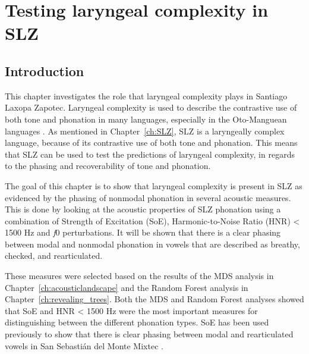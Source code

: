 \chapter{Testing laryngeal complexity in SLZ} \label{ch:testing_lc}

\section{Introduction}\label{sec:introduction_of_lc}

This chapter investigates the role that laryngeal complexity plays in Santiago Laxopa Zapotec. Laryngeal complexity is used to describe the contrastive use of both tone and phonation in many languages, especially in the Oto-Manguean languages \citep{blankenshipTimeCourseBreathiness1997,blankenshipTimingNonmodalPhonation2002,silvermanLaryngealComplexityOtomanguean1997,silvermanPhasingRecoverability1997}. As mentioned in Chapter~\ref{ch:SLZ}, SLZ is a laryngeally complex language, because of its contrastive use of both tone and phonation. This means that SLZ can be used to test the predictions of laryngeal complexity, in regards to the phasing and recoverability of tone and phonation.

The goal of this chapter is to show that laryngeal complexity is present in SLZ as evidenced by the phasing of nonmodal phonation in several acoustic measures. This is done by looking at the acoustic properties of SLZ phonation using a combination of Strength of Excitation (SoE), Harmonic-to-Noise Ratio (HNR) < 1500 Hz and \textit{f}0 perturbations. It will be shown that there is a clear phasing between modal and nonmodal phonation in vowels that are described as breathy, checked, and rearticulated. 

These measures were selected based on the results of the MDS analysis in Chapter~\ref{ch:acousticlandscape} and the Random Forest analysis in Chapter~\ref{ch:revealing_trees}. Both the MDS and Random Forest analyses showed that SoE and HNR < 1500 Hz were the most important measures for distinguishing between the different phonation types. SoE has been used previously to show that there is clear phasing between modal and rearticulated vowels in San Sebastián del Monte Mixtec \citep{wellerInteractionsToneGlottalization2023,wellerLexicalToneVowel2023,wellerVoiceQualityTone2024}. 

